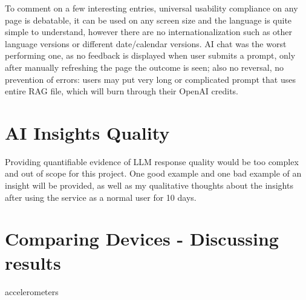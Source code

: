 To comment on a few interesting entries, universal usability compliance on any page is debatable, it can be used on any screen size and the language is quite simple to understand, however there are no internationalization such as other language versions or different date/calendar versions. AI chat was the worst performing one, as no feedback is displayed when user submits a prompt, only after manually refreshing the page the outcome is seen; also no reversal, no prevention of errors: users may put very long or complicated prompt that uses entire RAG file, which will burn through their OpenAI credits. 
\section{AI Insights Quality}
Providing quantifiable evidence of LLM response quality would be too complex and out of scope for this project. One good example and one bad example of an insight will be provided, as well as my qualitative thoughts about the insights after using the service as a normal user for 10 days. 
\section{Comparing Devices - Discussing results}
accelerometers